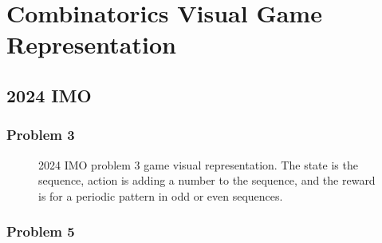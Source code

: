 
\section{Combinatorics Visual Game Representation}
\label{appendix:G}

\subsection*{2024 IMO}
\label{appendix:G_2024_IMO}



\subsubsection*{Problem 3}

\begin{figure}[htb]
  \centering
  \setlength{\fboxsep}{0.5pt} 
  \setlength{\fboxrule}{0.5pt} 
  \caption{2024 IMO problem 3 game visual representation. The state is the sequence, action is adding a number to the sequence, and the reward is for a periodic pattern in odd or even sequences.}
  \label{fig:imo2024-p3}
\end{figure}

\newpage
\clearpage

\subsubsection*{Problem 5}

